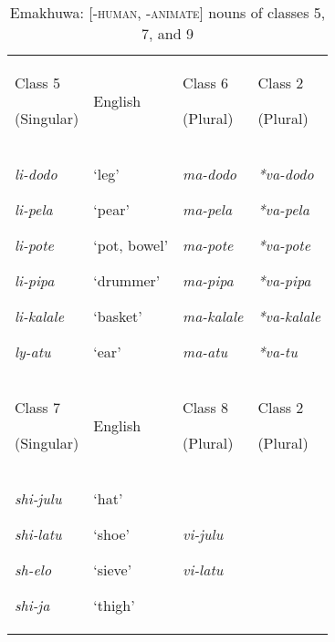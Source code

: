 \documentclass[output=paper]{langsci/langscibook}
\begin{document}
\begin{table}
\caption{Emakhuwa: [-\textsc{human, -animate}] nouns of classes 5, 7, and 9}
\label{tab:1}

\begin{tabularx}{\textwidth}{XXXX}
\lsptoprule

 Class 5

 (Singular)& English& Class 6

 (Plural)& Class 2

 (Plural)\\
 \textit{li-dodo}

 \textit{li-pela}

 \textit{li-pote}

 \textit{li-pipa}

 {\textit{li-kalale}}

 {\textit{ly-atu}}& ‘leg’

 ‘pear’

 ‘pot, bowel’

 ‘drummer’

 {‘basket’}

 {‘ear’}& \textit{ma-dodo}

 \textit{ma-pela}

 \textit{ma-pote}

 \textit{ma-pipa}

 {\textit{ma-kalale}}

 {\textit{ma-atu}}& \textit{*va-dodo}

 \textit{*va-pela}

 \textit{*va-pote}

 \textit{*va-pipa}

 {\textit{*va-kalale}}

 {\textit{*va-tu}}\\
 Class 7

 (Singular)& English& Class 8

 (Plural)& Class 2

 (Plural)\\
 \textit{shi-julu}

 {\textit{shi-latu}}

 {\textit{sh-elo}}

 \textit{shi-ja}& ‘hat’

 {‘shoe’}

 {‘sieve’}

 ‘thigh’& \textit{vi-julu}

 {\textit{vi-latu}}


\end{tabularx}
\end{table}
\end{document}
